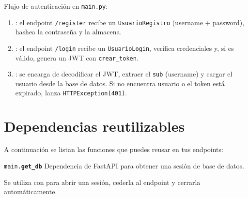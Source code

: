 \documentclass[a4paper,11pt,spanish]{sphinxmanual}
\newcommand{\robotoMonoBold}{\fontseries{b}\selectfont\ttfamily}
\renewcommand{\sphinxcode}[1]{\textcolor{sphinxorangeCode}{{\robotoMonoBold #1}}}
\renewcommand{\sphinxbfcode}[1]{\textbf{\sphinxcode{#1}}}
\renewcommand{\sphinxupquote}[1]{\texttt{#1}}
\begin{document}
\sphinxAtStartPar
Flujo de autenticación en \sphinxcode{\sphinxupquote{main.py}}:
\begin{enumerate}
%
\item {} 
\sphinxAtStartPar
{}: el endpoint \sphinxcode{\sphinxupquote{/register}} recibe un \sphinxcode{\sphinxupquote{UsuarioRegistro}} (username + password), hashea la contraseña y la almacena.

\item {} 
\sphinxAtStartPar
{}: el endpoint \sphinxcode{\sphinxupquote{/login}} recibe un \sphinxcode{\sphinxupquote{UsuarioLogin}}, verifica credenciales y, si es válido, genera un JWT con \sphinxcode{\sphinxupquote{crear\_token}}.

\item {} 
\sphinxAtStartPar
{}: se encarga de decodificar el JWT, extraer el \sphinxcode{\sphinxupquote{sub}} (username) y cargar el usuario desde la base de datos. Si no encuentra usuario o el token está expirado, lanza \sphinxcode{\sphinxupquote{HTTPException(401)}}.

\end{enumerate}


\section{Dependencias reutilizables}
\label{\detokenize{configuracion:dependencias-reutilizables}}
\sphinxAtStartPar
A continuación se listan las funciones que puedes reusar en tus endpoints:
\label{\detokenize{configuracion:module-main}}

\begin{fulllineitems}
\label{\detokenize{configuracion:main.get_db}}
\pysigstartsignatures
\pysiglinewithargsret
{\sphinxcode{\sphinxupquote{main.}}\sphinxbfcode{\sphinxupquote{get\_db}}}
{}
{}
\pysigstopsignatures
\sphinxAtStartPar
Dependencia de FastAPI para obtener una sesión de base de datos.

\sphinxAtStartPar
Se utiliza con  para abrir una sesión, cederla al endpoint y cerrarla automáticamente.

\end{fulllineitems}
\end{document}
